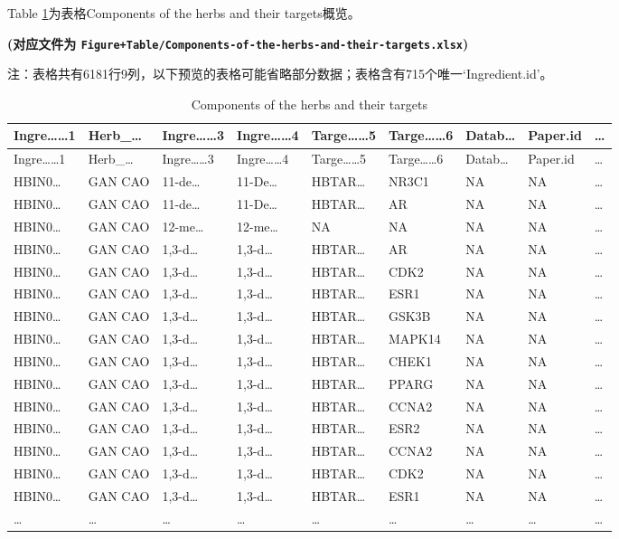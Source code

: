 \documentclass[
]{article}
\begin{document}
Table \ref{tab:Components-of-the-herbs-and-their-targets}为表格Components of the herbs and their targets概览。

\textbf{(对应文件为 \texttt{Figure+Table/Components-of-the-herbs-and-their-targets.xlsx})}

\begin{center}\begin{tcolorbox}[colback=gray!10, colframe=gray!50, width=0.9\linewidth, arc=1mm, boxrule=0.5pt]注：表格共有6181行9列，以下预览的表格可能省略部分数据；表格含有715个唯一`Ingredient.id'。
\end{tcolorbox}
\end{center}

\begin{longtable}[]{@{}lllllllll@{}}
\caption{\label{tab:Components-of-the-herbs-and-their-targets}Components of the herbs and their targets}\tabularnewline
\toprule
Ingre\ldots\ldots1 & Herb\_\ldots{} & Ingre\ldots\ldots3 & Ingre\ldots\ldots4 & Targe\ldots\ldots5 & Targe\ldots\ldots6 & Datab\ldots{} & Paper.id & \ldots{}\tabularnewline
\midrule
\endfirsthead
\toprule
Ingre\ldots\ldots1 & Herb\_\ldots{} & Ingre\ldots\ldots3 & Ingre\ldots\ldots4 & Targe\ldots\ldots5 & Targe\ldots\ldots6 & Datab\ldots{} & Paper.id & \ldots{}\tabularnewline
\midrule
\endhead
HBIN0\ldots{} & GAN CAO & 11-de\ldots{} & 11-De\ldots{} & HBTAR\ldots{} & NR3C1 & NA & NA & \ldots{}\tabularnewline
HBIN0\ldots{} & GAN CAO & 11-de\ldots{} & 11-De\ldots{} & HBTAR\ldots{} & AR & NA & NA & \ldots{}\tabularnewline
HBIN0\ldots{} & GAN CAO & 12-me\ldots{} & 12-me\ldots{} & NA & NA & NA & NA & \ldots{}\tabularnewline
HBIN0\ldots{} & GAN CAO & 1,3-d\ldots{} & 1,3-d\ldots{} & HBTAR\ldots{} & AR & NA & NA & \ldots{}\tabularnewline
HBIN0\ldots{} & GAN CAO & 1,3-d\ldots{} & 1,3-d\ldots{} & HBTAR\ldots{} & CDK2 & NA & NA & \ldots{}\tabularnewline
HBIN0\ldots{} & GAN CAO & 1,3-d\ldots{} & 1,3-d\ldots{} & HBTAR\ldots{} & ESR1 & NA & NA & \ldots{}\tabularnewline
HBIN0\ldots{} & GAN CAO & 1,3-d\ldots{} & 1,3-d\ldots{} & HBTAR\ldots{} & GSK3B & NA & NA & \ldots{}\tabularnewline
HBIN0\ldots{} & GAN CAO & 1,3-d\ldots{} & 1,3-d\ldots{} & HBTAR\ldots{} & MAPK14 & NA & NA & \ldots{}\tabularnewline
HBIN0\ldots{} & GAN CAO & 1,3-d\ldots{} & 1,3-d\ldots{} & HBTAR\ldots{} & CHEK1 & NA & NA & \ldots{}\tabularnewline
HBIN0\ldots{} & GAN CAO & 1,3-d\ldots{} & 1,3-d\ldots{} & HBTAR\ldots{} & PPARG & NA & NA & \ldots{}\tabularnewline
HBIN0\ldots{} & GAN CAO & 1,3-d\ldots{} & 1,3-d\ldots{} & HBTAR\ldots{} & CCNA2 & NA & NA & \ldots{}\tabularnewline
HBIN0\ldots{} & GAN CAO & 1,3-d\ldots{} & 1,3-d\ldots{} & HBTAR\ldots{} & ESR2 & NA & NA & \ldots{}\tabularnewline
HBIN0\ldots{} & GAN CAO & 1,3-d\ldots{} & 1,3-d\ldots{} & HBTAR\ldots{} & CCNA2 & NA & NA & \ldots{}\tabularnewline
HBIN0\ldots{} & GAN CAO & 1,3-d\ldots{} & 1,3-d\ldots{} & HBTAR\ldots{} & CDK2 & NA & NA & \ldots{}\tabularnewline
HBIN0\ldots{} & GAN CAO & 1,3-d\ldots{} & 1,3-d\ldots{} & HBTAR\ldots{} & ESR1 & NA & NA & \ldots{}\tabularnewline
\ldots{} & \ldots{} & \ldots{} & \ldots{} & \ldots{} & \ldots{} & \ldots{} & \ldots{} & \ldots{}\tabularnewline
\bottomrule
\end{longtable}
\end{document}
